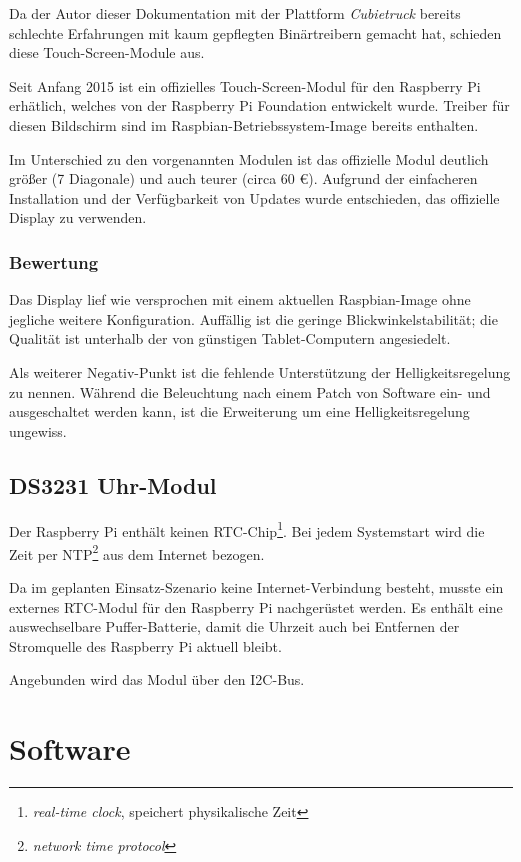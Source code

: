 \documentclass[11pt,a4paper]{IEEEtran} \usepackage[ngerman]{babel}
\begin{document}
Da der Autor dieser Dokumentation mit der Plattform \emph{Cubietruck} bereits
schlechte Erfahrungen mit kaum gepflegten Binärtreibern gemacht hat, schieden
diese Touch-Screen-Module aus.

Seit Anfang 2015 ist ein offizielles Touch-Screen-Modul für den Raspberry Pi
erhätlich, welches von der Raspberry Pi Foundation entwickelt wurde. Treiber
für diesen Bildschirm sind im Raspbian-Betriebssystem-Image bereits enthalten.

Im Unterschied zu den vorgenannten Modulen ist das offizielle Modul deutlich
größer (\SI{7}{\inch} Diagonale) und auch teurer (circa 60 \euro). Aufgrund der
einfacheren Installation und der Verfügbarkeit von Updates wurde entschieden,
das offizielle Display zu verwenden.

\subsubsection{Bewertung}

Das Display lief wie versprochen mit einem aktuellen Raspbian-Image ohne
jegliche weitere Konfiguration. Auffällig ist die geringe
Blickwinkelstabilität; die Qualität ist unterhalb der von günstigen
Tablet-Computern angesiedelt.

Als weiterer Negativ-Punkt ist die fehlende Unterstützung der
Helligkeitsregelung zu nennen. Während die Beleuchtung nach einem Patch von
Software ein- und ausgeschaltet werden kann, ist die Erweiterung um eine
Helligkeitsregelung ungewiss\autocite{TouchBacklight}.

\subsection{DS3231 Uhr-Modul}

Der Raspberry Pi enthält keinen RTC-Chip\footnote{\emph{real-time clock},
speichert physikalische Zeit}. Bei jedem Systemstart wird die Zeit per
NTP\footnote{\emph{network time protocol}} aus dem Internet bezogen.

Da im geplanten Einsatz-Szenario keine Internet-Verbindung besteht, musste ein
externes RTC-Modul für den Raspberry Pi nachgerüstet werden. Es enthält eine
auswechselbare Puffer-Batterie, damit die Uhrzeit auch bei Entfernen der
Stromquelle des Raspberry Pi aktuell bleibt. 


Angebunden wird das Modul über den I2C-Bus.

\section{Software} \label{sec:sw}
\end{document}
